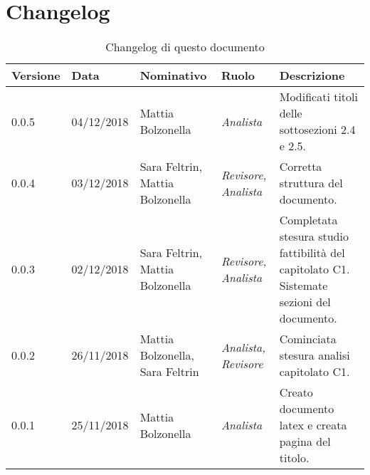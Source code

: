 \section{Changelog}
\begin{table}[tbph]
        \centering
        \begin{tabularx}{\textwidth}{|l|l|l|l|X|}
                \hline
                \textbf{Versione} & \textbf{Data} & \textbf{Nominativo}  & \textbf{Ruolo} & 
                \textbf{Descrizione}\\
              	\hline \hline
              	0.0.5 & 04/12/2018 & Mattia Bolzonella & \textit{Analista} & 
              	Modificati titoli delle sottosezioni 2.4 e 2.5. \\
              	\hline
              	0.0.4 & 03/12/2018 & Sara Feltrin, Mattia Bolzonella 
              	& \textit{Revisore, Analista} & Corretta struttura del documento. \\
              	\hline
              	0.0.3 & 02/12/2018 & Sara Feltrin, Mattia Bolzonella & \textit{Revisore, Analista}
              	& Completata stesura studio fattibilità del capitolato C1.
              	Sistemate sezioni del documento. \\
              	\hline
              	0.0.2 & 26/11/2018 & Mattia Bolzonella, Sara Feltrin & \textit{Analista, Revisore}
              	& Cominciata stesura analisi capitolato C1.\\
                \hline
                0.0.1 & 25/11/2018 & Mattia Bolzonella & \textit{Analista}
                & Creato documento latex e creata pagina del titolo.\\
                \hline
              	
        \end{tabularx}
        \caption{Changelog di questo documento}
\end{table}